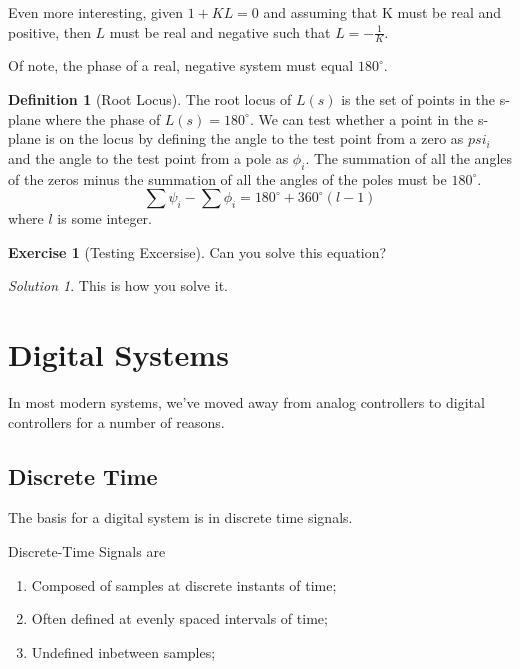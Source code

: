 \documentclass[
]{book}
\providecommand{\tightlist}{%
  \setlength{\itemsep}{0pt}\setlength{\parskip}{0pt}}
\theoremstyle{definition}
\newtheorem{definition}{Definition}[chapter]
\theoremstyle{definition}
\theoremstyle{definition}
\newtheorem{exercise}{Exercise}[chapter]
\theoremstyle{remark}
\newtheorem*{solution}{Solution}
\begin{document}
Even more interesting, given \(1 + KL = 0\) and assuming that K must be real and positive, then \(L\) must be real and negative such that \(L=-\frac{1}{K}\).

Of note, the phase of a real, negative system must equal \(180^\circ\).

\begin{definition}[Root Locus]
\protect\hypertarget{def:unnamed-chunk-3}{}{\label{def:unnamed-chunk-3} \iffalse (Root Locus) \fi{} }The root locus of \(L(s)\) is the set of points in the s-plane where the phase of \(L(s) = 180^\circ\). We can test whether a point in the s-plane is on the locus by defining the angle to the test point from a zero as \(psi_i\) and the angle to the test point from a pole as \(\phi_i\). The summation of all the angles of the zeros minus the summation of all the angles of the poles must be \(180^\circ\).\\
\begin{equation}
\sum\psi_i - \sum\phi_i = 180^\circ + 360^\circ \left(l-1\right)
\end{equation}
where \(l\) is some integer.
\end{definition}

\begin{exercise}[Testing Excersise]
\protect\hypertarget{exr:foo1}{}{\label{exr:foo1} \iffalse (Testing Excersise) \fi{} }Can you solve this equation?
\end{exercise}
\begin{solution}
\iffalse{} {Solution. } \fi{}This is how you solve it.
\end{solution}

\hypertarget{digital-systems}{%
\chapter{Digital Systems}\label{digital-systems}}

In most modern systems, we've moved away from analog controllers to digital controllers for a number of reasons.

\hypertarget{discrete-time}{%
\section{Discrete Time}\label{discrete-time}}

The basis for a digital system is in discrete time signals.

Discrete-Time Signals are

\begin{enumerate}
\def\labelenumi{\arabic{enumi}.}
\tightlist
\item
  Composed of samples at discrete instants of time;
\item
  Often defined at evenly spaced intervals of time;
\item
  Undefined inbetween samples;
\end{enumerate}
\end{document}
